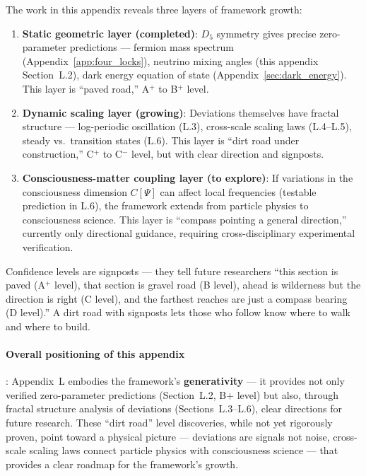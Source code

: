 \documentclass[12pt,a4paper,twocolumn]{article}
\begin{document}
The work in this appendix reveals three layers of framework growth:

\begin{enumerate}
\item \textbf{Static geometric layer (completed)}: $D_5$ symmetry gives precise zero-parameter predictions --- fermion mass spectrum (Appendix~\ref{app:four_locks}), neutrino mixing angles (this appendix Section~L.2), dark energy equation of state (Appendix~\ref{sec:dark_energy}). This layer is ``paved road,'' A$^+$ to B$^+$ level.

\item \textbf{Dynamic scaling layer (growing)}: Deviations themselves have fractal structure --- log-periodic oscillation (L.3), cross-scale scaling laws (L.4--L.5), steady vs.\ transition states (L.6). This layer is ``dirt road under construction,'' C$^+$ to C$^-$ level, but with clear direction and signposts.

\item \textbf{Consciousness-matter coupling layer (to explore)}: If variations in the consciousness dimension $C[\Psi]$ can affect local frequencies (testable prediction in L.6), the framework extends from particle physics to consciousness science. This layer is ``compass pointing a general direction,'' currently only directional guidance, requiring cross-disciplinary experimental verification.
\end{enumerate}

Confidence levels are signposts --- they tell future researchers ``this section is paved (A$^+$ level), that section is gravel road (B level), ahead is wilderness but the direction is right (C level), and the farthest reaches are just a compass bearing (D level).'' A dirt road with signposts lets those who follow know where to walk and where to build.

\paragraph{Overall positioning of this appendix}: Appendix~L embodies the framework's \textbf{generativity} --- it provides not only verified zero-parameter predictions (Section~L.2, B+ level) but also, through fractal structure analysis of deviations (Sections~L.3--L.6), clear directions for future research. These ``dirt road'' level discoveries, while not yet rigorously proven, point toward a physical picture --- deviations are signals not noise, cross-scale scaling laws connect particle physics with consciousness science --- that provides a clear roadmap for the framework's growth.
\end{document}
